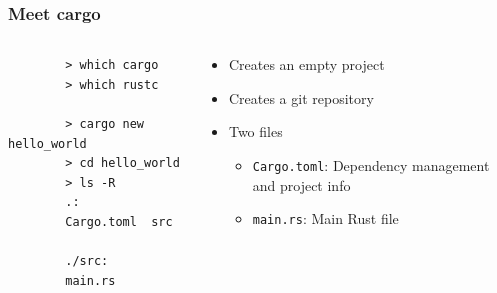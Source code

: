 \documentclass[aspectratio=169]{beamer}
\begin{document}
\begin{frame}[fragile]
  \frametitle{Meet cargo}
  \begin{columns}
    \begin{column}{.5\linewidth}
      \begin{verbatim}
        > which cargo
        > which rustc

        > cargo new hello_world
        > cd hello_world
        > ls -R
        .:
        Cargo.toml  src

        ./src:
        main.rs
      \end{verbatim}
    \end{column}

    \begin{column}{.6\linewidth}
      \begin{itemize}
      \item Creates an empty project
      \item Creates a git repository
      \item Two files
        \begin{itemize}
        \item \texttt{Cargo.toml}: Dependency management and project info
        \item \texttt{main.rs}: Main Rust file
        \end{itemize}

      \end{itemize}
    \end{column}
  \end{columns}
\end{frame}
\end{document}
